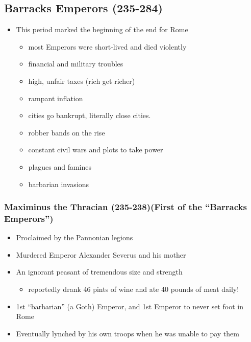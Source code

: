 \documentclass[12pt, twoside]{article}
\begin{document}
\subsection{Barracks Emperors (235-284)}
\begin{itemize}
\item This period marked the beginning of the end for Rome
	\begin{itemize}
	\item most Emperors were short-lived and died violently
	\item financial and military troubles
	\item high, unfair taxes (rich get richer)
	\item rampant inflation
	\item cities go bankrupt, literally close cities.
	\item robber bands on the rise
	\item constant civil wars and plots to take power
	\item plagues and famines
	\item barbarian invasions
	\end{itemize}
\end{itemize}

\subsubsection{Maximinus the Thracian (235-238)(First of the “Barracks Emperors”)}
\begin{itemize}
\item Proclaimed by the Pannonian legions
\item Murdered Emperor Alexander Severus and his mother
\item An ignorant peasant of tremendous size and strength
	\begin{itemize}
	\item reportedly drank 46 pints of wine and ate 40 pounds of meat daily!
	\end{itemize}
\item 1st “barbarian” (a Goth) Emperor, and 1st Emperor to never set foot in Rome
\item Eventually lynched by his own troops when he was unable to pay them
\end{itemize}
\end{document}
